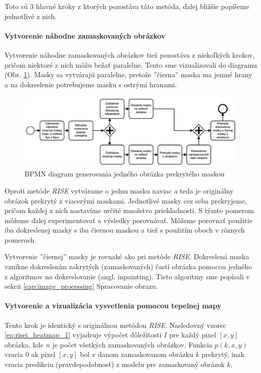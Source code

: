 Toto sú 3 hlavné kroky z ktorých pozostáva táto metóda, ďalej bližšie popíšeme jednotlivé z nich.

\paragraph{Vytvorenie náhodne zamaskovaných obrázkov}

Vytvorenie náhodne zamaskovaných obrázkov tiež pozostáva z niekoľkých krokov, pričom niektoré z nich môžu bežať paralelne. Tento sme vizualizovali do diagramu (Obr. \ref{fig:risei_diagram}). Masky sa vytvárajú paralelne, pretože ''čierna'' maska ma jemné hrany a na dokreslenie potrebujeme masku s ostrými hranami.

\begin{figure}[h!]
    \centering
    \includegraphics[scale=0.45]{assets/images/risei_diagram.png}
    \caption{BPMN diagram generovania jedného obrázka prekrytého maskou}
    \label{fig:risei_diagram}
\end{figure}

Oproti metóde \textit{RISE} vytvárame o jednu masku naviac a teda je originálny obrázok prekrytý z viacerými maskami. Jednotlivé masky cez seba prekryjeme, pričom každej z nich nastavíme určité množstvo priehľadnosti. S týmto pomerom môžeme ďalej experimentovať a výsledky porovnávať. Môžeme porovnať použitie iba dokreslenej masky s iba čiernou maskou a tiež s použitím oboch v rôznych pomeroch.

Vytvorenie ''čiernej'' masky je rovnaké ako pri metóde \textit{RISE}. Dokreslená maska vznikne dokreslením zakrytých (zamaskovaných) častí obrázka pomocou jedného z algoritmov na dokreslovanie (angl. inpainting). Tieto algoritmy sme popísali v sekcii \ref{cap:image_processing} Spracovanie obrazu.

\paragraph{Vytvorenie a vizualizácia vysvetlenia pomocou tepelnej mapy}

Tento krok je identický s originálnou metódou \textit{RISE}. Nasledovný vzorec \ref{eq:risei_heatmap_1} vyjadruje výpočet dôležitosti $I$ pre každý pixel $[x, y]$ obrázka, kde $n$ je počet všetkých zamaskovaných obrázkov. Funkcia $p(k, x, y)$ vracia $0$ ak pixel $[x, y]$ bol v danom zamaskovanom obrázku $k$ prekrytý, inak vracia predikciu (pravdepodobnosť) z modelu pre zamaskovaný obrázok $k$.

